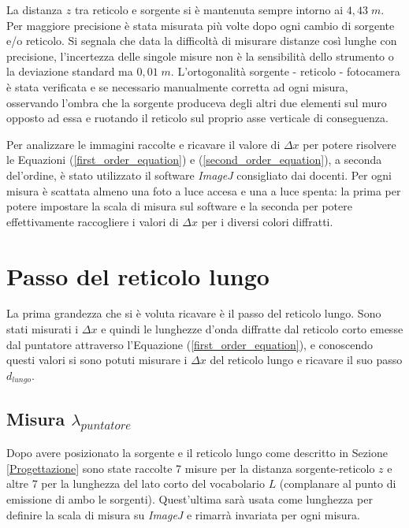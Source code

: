 \documentclass{article}
\begin{document}
La distanza $z$ tra reticolo e sorgente si è mantenuta sempre intorno ai $4,43 \; m$. Per maggiore precisione è stata misurata più volte dopo ogni cambio di sorgente e/o reticolo. Si segnala che data la difficoltà di misurare distanze così lunghe con precisione, l'incertezza delle singole misure non è la sensibilità dello strumento o la deviazione standard ma $0,01 \; m$.
L'ortogonalità sorgente - reticolo - fotocamera è stata verificata e se necessario manualmente corretta ad ogni misura, osservando l'ombra che la sorgente produceva degli altri due elementi sul muro opposto ad essa e ruotando il reticolo sul proprio asse verticale di conseguenza.

\vspace{3mm}

Per analizzare le immagini raccolte e ricavare il valore di $\Delta x$ per potere risolvere le Equazioni (\ref{first_order_equation}) e (\ref{second_order_equation}), a seconda del'ordine, è stato utilizzato il software \textit{ImageJ} consigliato dai docenti. Per ogni misura è scattata almeno una foto a luce accesa e una a luce spenta: la prima per potere impostare la scala di misura sul software e la seconda per potere effettivamente raccogliere i valori di $\Delta x$ per i diversi colori diffratti.

\clearpage

\section{Passo del reticolo lungo}

La prima grandezza che si è voluta ricavare è il passo del reticolo lungo. Sono stati misurati i $\Delta x$ e quindi le lunghezze d'onda diffratte dal reticolo corto emesse dal puntatore attraverso l'Equazione (\ref{first_order_equation}), e conoscendo questi valori si sono potuti misurare i $\Delta x$ del reticolo lungo e ricavare il suo passo $d_{lungo}$.

\subsection{Misura \textrm{$\lambda_{puntatore}$}} \label{3.1}
Dopo avere posizionato la sorgente e il reticolo lungo come descritto in Sezione \ref{Progettazione} sono state raccolte 7 misure per la distanza sorgente-reticolo $z$ e altre 7 per la lunghezza del lato corto del vocabolario $L$ (complanare al punto di emissione di ambo le sorgenti). Quest'ultima sarà usata come lunghezza per definire la scala di misura su \textit{ImageJ} e rimarrà invariata per ogni misura. 
\end{document}
